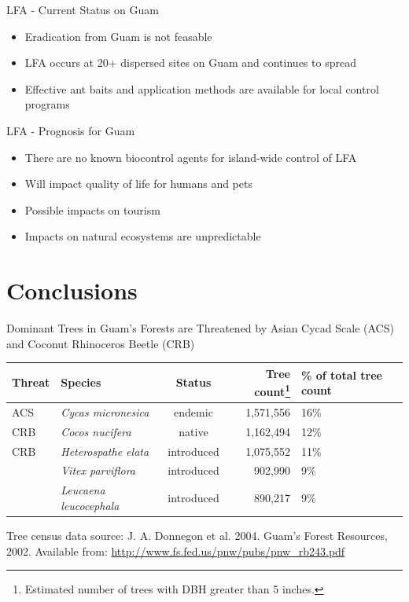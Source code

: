 \documentclass[]{beamer}
\begin{document}
\begin{frame}{LFA - Current Status on Guam}
	\begin{itemize}
		\item Eradication from Guam is not feasable
		\item LFA occurs at 20+ dispersed sites on Guam and continues to spread
		\item Effective ant baits and application methods are available for local control programs
	\end{itemize}
\end{frame}

\begin{frame}{LFA - Prognosis for Guam}
	\begin{itemize}
		\item There are no known biocontrol agents for island-wide control of LFA
		\item Will impact quality of life for humans and pets
		\item Possible impacts on tourism
		\item Impacts on natural ecosystems are unpredictable
	\end{itemize}
\end{frame}

\section{Conclusions}

\begin{frame}{Dominant Trees in Guam's Forests are Threatened by Asian Cycad Scale (ACS) and Coconut Rhinoceros Beetle (CRB)}
	\begin{center}
		\begin{tabular}{llcrp{0.35in}}
			\hline
			\textbf{Threat} & \textbf{Species} & \textbf{Status} & \textbf{Tree count\footnote{Estimated number of trees with DBH greater than 5 inches.}} & \textbf{\% of total tree count}\\
			\hline
			\rowcolor{yellow}
			ACS & \textit{Cycas micronesica} & endemic & 1,571,556 & 16\% \\ 
			\rowcolor{yellow}
			CRB & \textit{Cocos nucifera} & native & 1,162,494 & 12\% \\ 
			\rowcolor{yellow}
			CRB & \textit{Heterospathe elata} & introduced & 1,075,552 & 11\% \\ 
			
			\hline
			& \textit{Vitex parviflora} & introduced & 902,990 & 9\% \\ 
			& \textit{Leucaena leucocephala} & introduced & 890,217 & 9\%\\
			\hline
		\end{tabular} 
	\end{center}
	Tree census data source: J. A. Donnegon et al. 2004. Guam’s Forest Resources, 2002. Available from: \url{http://www.fs.fed.us/pnw/pubs/pnw_rb243.pdf}	
\end{frame}
\end{document}
